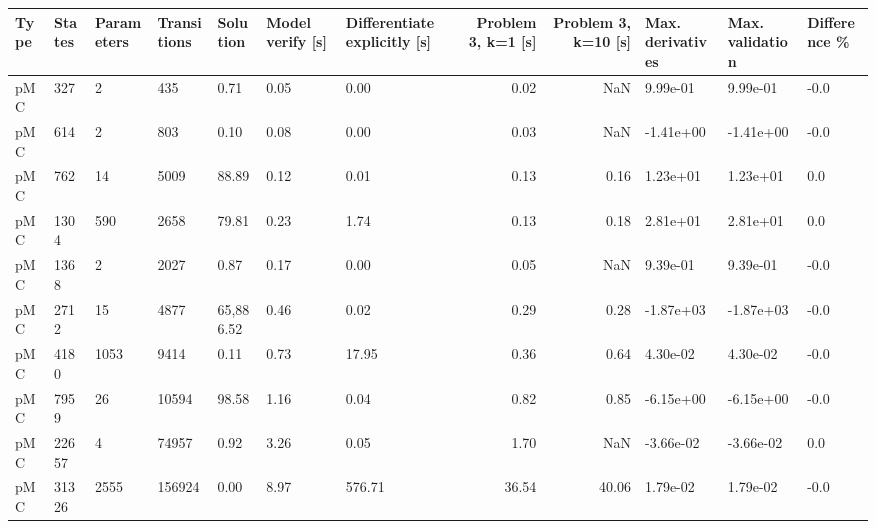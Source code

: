 \begin{tabular}{lllllllrrlll}
\toprule
Type & States & Parameters & Transitions &  Solution & Model verify [s] & Differentiate explicitly [s] &  Problem 3, k=1 [s] &  Problem 3, k=10 [s] & Max. derivatives & Max. validation & Difference \% \\
\midrule
 pMC &    327 &          2 &         435 &      0.71 &             0.05 &                         0.00 &                0.02 &                  NaN &         9.99e-01 &        9.99e-01 &         -0.0 \\
 pMC &    614 &          2 &         803 &      0.10 &             0.08 &                         0.00 &                0.03 &                  NaN &        -1.41e+00 &       -1.41e+00 &         -0.0 \\
 pMC &    762 &         14 &        5009 &     88.89 &             0.12 &                         0.01 &                0.13 &                 0.16 &         1.23e+01 &        1.23e+01 &          0.0 \\
 pMC &   1304 &        590 &        2658 &     79.81 &             0.23 &                         1.74 &                0.13 &                 0.18 &         2.81e+01 &        2.81e+01 &          0.0 \\
 pMC &   1368 &          2 &        2027 &      0.87 &             0.17 &                         0.00 &                0.05 &                  NaN &         9.39e-01 &        9.39e-01 &         -0.0 \\
 pMC &   2712 &         15 &        4877 & 65,886.52 &             0.46 &                         0.02 &                0.29 &                 0.28 &        -1.87e+03 &       -1.87e+03 &         -0.0 \\
 pMC &   4180 &       1053 &        9414 &      0.11 &             0.73 &                        17.95 &                0.36 &                 0.64 &         4.30e-02 &        4.30e-02 &         -0.0 \\
 pMC &   7959 &         26 &       10594 &     98.58 &             1.16 &                         0.04 &                0.82 &                 0.85 &        -6.15e+00 &       -6.15e+00 &         -0.0 \\
 pMC &  22657 &          4 &       74957 &      0.92 &             3.26 &                         0.05 &                1.70 &                  NaN &        -3.66e-02 &       -3.66e-02 &          0.0 \\
 pMC &  31326 &       2555 &      156924 &      0.00 &             8.97 &                       576.71 &               36.54 &                40.06 &         1.79e-02 &        1.79e-02 &         -0.0 \\

\end{tabular}
